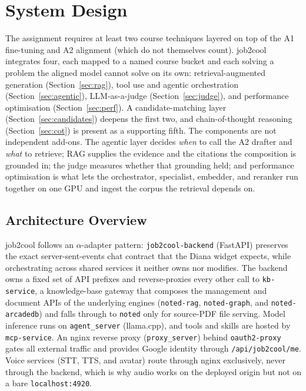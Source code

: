 \section{System Design}

The assignment requires at least two course techniques layered on top of the A1
fine-tuning and A2 alignment (which do not themselves count). job2cool integrates four,
each mapped to a named course bucket and each solving a problem the aligned model cannot
solve on its own: retrieval-augmented generation (Section~\ref{sec:rag}), tool use and
agentic orchestration (Section~\ref{sec:agentic}), LLM-as-a-judge
(Section~\ref{sec:judge}), and performance optimisation (Section~\ref{sec:perf}). A
candidate-matching layer (Section~\ref{sec:candidates}) deepens the first two, and
chain-of-thought reasoning (Section~\ref{sec:cot}) is present as a supporting fifth. The
components are not independent add-ons. The agentic layer decides \emph{when} to call the
A2 drafter and \emph{what} to retrieve; RAG supplies the evidence and the citations the
composition is grounded in; the judge measures whether that grounding held; and
performance optimisation is what lets the orchestrator, specialist, embedder, and reranker
run together on one GPU and ingest the corpus the retrieval depends on.

\subsection{Architecture Overview}

job2cool follows an $\alpha$-adapter pattern: \verb|job2cool-backend| (FastAPI) preserves
the exact server-sent-events chat contract that the Diana widget expects, while
orchestrating across shared services it neither owns nor modifies. The backend owns a
fixed set of API prefixes and reverse-proxies every other call to \verb|kb-service|, a
knowledge-base gateway that composes the management and document APIs of the underlying
engines (\verb|noted-rag|, \verb|noted-graph|, and \verb|noted-arcadedb|) and falls
through to \verb|noted| only for source-PDF file serving. Model inference runs on
\verb|agent_server| (llama.cpp), and tools and skills are hosted by \verb|mcp-service|. An
nginx reverse proxy (\verb|proxy_server|) behind \verb|oauth2-proxy| gates all external
traffic and provides Google identity through \verb|/api/job2cool/me|. Voice services (STT,
TTS, and avatar) route through nginx exclusively, never through the backend, which is why
audio works on the deployed origin but not on a bare \verb|localhost:4920|.

